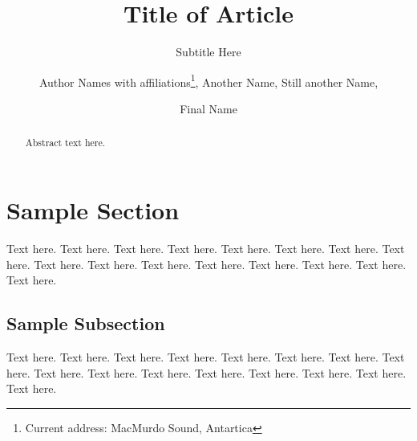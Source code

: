 \documentclass[manuscript]{stjour}
\begin{document}
\title{Title of Article}
\subtitle{Subtitle Here}



\author[Author Names]
{Author Names with affiliations\thanks{Current address: MacMurdo
Sound, Antartica},
Another Name, Still another Name,\\
\and Final Name}









\begin{abstract}
Abstract text here.
\end{abstract}



\section{Sample Section}
Text here. Text here. Text here. Text here.
Text here. Text here. Text here. Text here.
Text here. Text here. Text here. Text here.
Text here. Text here. Text here. Text here.

\subsection{Sample Subsection}
Text here. Text here. Text here. Text here.
Text here. Text here. Text here. Text here.
Text here. Text here. Text here. Text here.
Text here. Text here. Text here. Text here.
\end{document}
